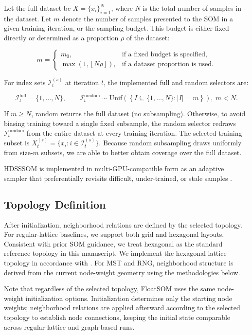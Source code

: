 \documentclass[11pt]{article}
\begin{document}
Let the full dataset be $X=\{x_i\}_{i=1}^{N}$, where $N$ is the total number of samples in the dataset. Let $m$ denote the number of samples presented to the SOM in a given training iteration, or the sampling budget. This budget is either fixed directly or determined as a proportion $\rho$ of the dataset:

\[
m=
\begin{cases}
m_0, & \text{if a fixed budget is specified},\\[4pt]
\max\!\left(1,\left\lfloor N\rho \right\rfloor\right), & \text{if a dataset proportion is used}.
\end{cases}
\tag{1}
\]

For index sets $\mathcal{I}_t^{(s)}$ at iteration $t$, the implemented full and random selectors are:

\[
\mathcal{I}_t^{\mathrm{full}}=\{1,\dots,N\},
\qquad
\mathcal{I}_t^{\mathrm{random}} \sim \mathrm{Unif}\!\left(\left\{I\subseteq\{1,\dots,N\}:|I|=m\right\}\right),\ m<N.
\tag{2}
\]

If $m\ge N$, random returns the full dataset (no subsampling). Otherwise, to avoid biasing training toward a single fixed subsample, the random selector redraws $\mathcal{I}_t^{\mathrm{random}}$ from the entire dataset at every training iteration. The selected training subset is $X_t^{(s)}=\{x_i:i\in\mathcal{I}_t^{(s)}\}$. Because random subsampling draws uniformly from size-$m$ subsets, we are able to better obtain coverage over the full dataset.

HDSSSOM is implemented in multi-GPU-compatible form as an adaptive sampler that preferentially revisits difficult, under-trained, or stale samples \citep{wetmoreSpeedingSelfOrganizingFeature2005}.

\subsection{Topology Definition}

After initialization, neighborhood relations are defined by the selected topology. For regular-lattice baselines, we support both grid and hexagonal layouts. Consistent with prior SOM guidance, we treat hexagonal as the standard reference topology in this manuscript. We implement the hexagonal lattice topology in accordance with \citep{vettigliJustGlowingMinisom2018}. For MST and RNG, neighborhood structure is derived from the current node-weight geometry using the methodologies below.

Note that regardless of the selected topology, FloatSOM uses the same node-weight initialization options. Initialization determines only the starting node weights; neighborhood relations are applied afterward according to the selected topology to establish node connections, keeping the initial state comparable across regular-lattice and graph-based runs.
\end{document}
